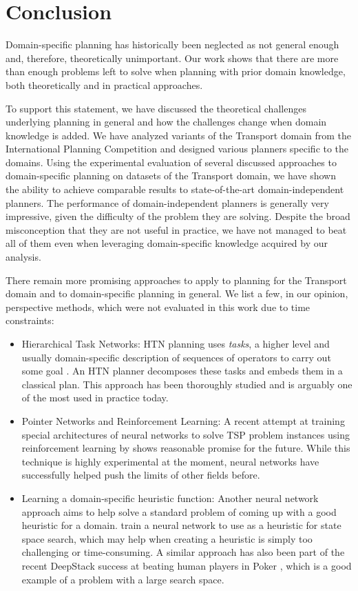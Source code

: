 \chapter*{Conclusion}

Domain-specific planning has historically been neglected as not general enough
and, therefore, theoretically unimportant.
Our work shows that there are more than enough problems
left to solve when planning with prior domain knowledge,
both theoretically and in practical approaches.

To support this statement,
we have discussed the theoretical challenges underlying
planning in general and how the challenges change when
domain knowledge is added.
We have analyzed variants of the Transport domain from the International Planning Competition
and designed various planners specific to the domains.
Using the experimental evaluation of several discussed approaches to
domain-specific planning on datasets of the Transport domain, we have shown the ability to achieve comparable results to state-of-the-art domain-independent planners.
The performance of domain-independent planners is generally very impressive, given the difficulty of the problem they are solving. Despite the broad misconception that they are not useful in practice,
we have not managed to beat all of them even when leveraging domain-specific knowledge acquired by our analysis.

There remain more promising approaches to apply to planning
for the Transport domain
and to domain-specific planning in general.
We list a few, in our opinion, perspective methods, which were not
evaluated in this work due to time constraints:
\begin{itemize}
\item Hierarchical Task Networks: 
HTN planning uses \textit{tasks},
a higher level and usually domain-specific description of sequences of operators
to carry out some goal \citep[Chapter~11]{Ghallab2004}.
An HTN planner decomposes these tasks and embeds them in a classical plan. This approach has been thoroughly studied and is arguably one of the most used in practice today.

\item Pointer Networks and Reinforcement Learning: 
A recent attempt at training special architectures of neural networks to solve TSP problem instances using reinforcement learning by \citet{Bello2016} shows
reasonable promise for the future. While this technique is highly experimental at the moment,
neural networks have successfully helped push the limits of other fields before.

\item Learning a domain-specific heuristic function: Another neural network
approach aims to help solve a standard problem of coming up with a good heuristic for a domain. \citet{Chen2011}
train a neural network to use as a heuristic for state space search,
which may help when creating a heuristic is simply too challenging or time-consuming.
A similar approach has also been part of the recent DeepStack success at
beating human players in Poker \citep{Moravcik2017}, which is a good example of a problem with a large search space.
\end{itemize}

